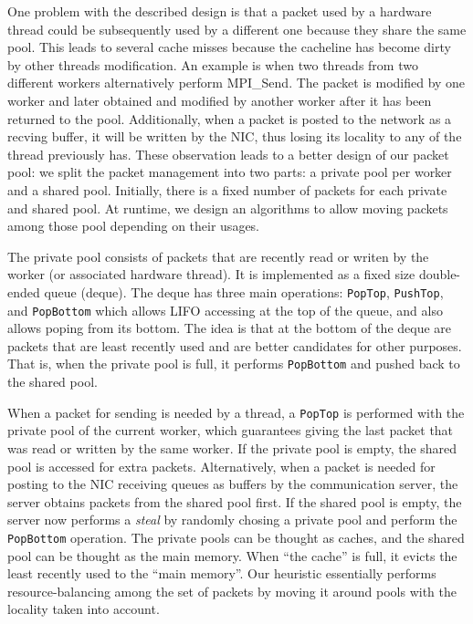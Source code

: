 \documentclass{sig-alternate-05-2015}
\begin{document}
One problem with the described design is that a packet used by a hardware
thread could be subsequently used by a different one because they share the
same pool. This leads to several cache misses because the cacheline has become
dirty by other threads modification. An example is when two threads from two
different workers alternatively perform MPI_Send. The packet is modified by one
worker and later obtained and modified by another worker after it has been
returned to the pool. Additionally, when a packet is posted to the network as
a recving buffer, it will be written by the NIC, thus losing its locality to
any of the thread previously has. These observation leads to a better design
of our packet pool: we split the packet management into two parts: a private
pool per worker and a shared pool. Initially, there is a fixed number of 
packets for each private and shared pool. At runtime, we design an algorithms to 
allow moving packets among those pool depending on their usages.

The private pool consists of packets that are recently read or writen by the
worker (or associated hardware thread). It is implemented as a fixed size
double-ended queue (deque). The deque has three main operations:
\texttt{PopTop}, \texttt{PushTop}, and \texttt{PopBottom} which allows LIFO
accessing at the top of the queue, and also allows poping from its bottom. The
idea is that at the bottom of the deque are packets that are least recently
used and are better candidates for other purposes. That is, when the private
pool is full, it performs \texttt{PopBottom} and pushed back to
the shared pool.

When a packet for sending is needed by a thread, a \texttt{PopTop} is performed
with the private pool of the current worker, which guarantees giving the last
packet that was read or written by the same worker. If the private pool is
empty, the shared pool is accessed for extra packets.  Alternatively, when a
packet is needed for posting to the NIC receiving queues as buffers by the
communication server, the server obtains packets from the shared pool first.
If the shared pool is empty, the server now performs a \textit{steal} by
randomly chosing a private pool and perform the \texttt{PopBottom} operation.
The private pools can be thought as caches, and the shared pool can be thought
as the main memory. When ``the cache'' is full, it evicts the least recently
used to the ``main memory''. Our heuristic essentially performs
resource-balancing among the set of packets by moving it around pools with the
locality taken into account.
\end{document}
